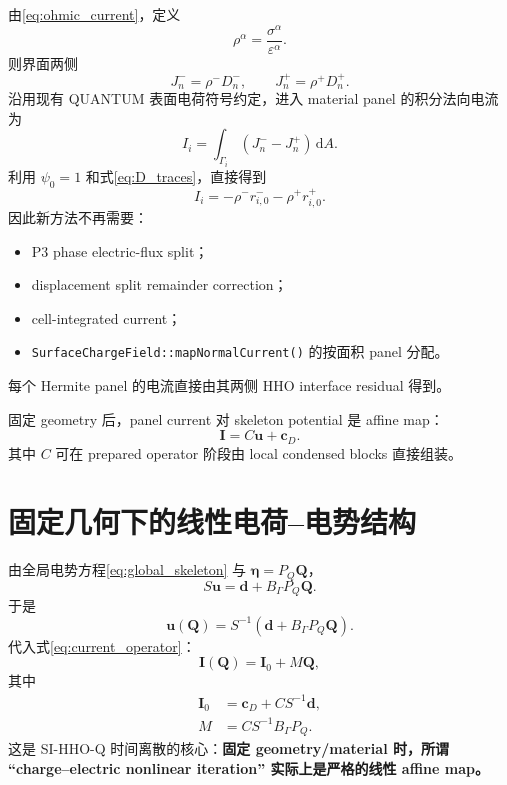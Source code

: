 \documentclass[UTF8,a4paper,11pt]{ctexart}
\newcommand{\dd}{\mathrm{d}}
\newcommand{\eps}{\varepsilon}
\newcommand{\vct}[1]{\bm{#1}}
\begin{document}
由\eqref{eq:ohmic_current}，定义
\[
\rho^\alpha=\frac{\sigma^\alpha}{\eps^\alpha}.
\]
则界面两侧
\[
J_n^-=\rho^-D_n^-,\qquad
J_n^+=\rho^+D_n^+.
\]
沿用现有 QUANTUM 表面电荷符号约定，进入 material panel 的积分法向电流为
\begin{equation}
I_i=\int_{\Gamma_i}(J_n^--J_n^+)\,\dd A.
\label{eq:panel_current_def}
\end{equation}
利用 \(\psi_0=1\) 和式\eqref{eq:D_traces}，直接得到
\begin{equation}
\boxed{
I_i
=-\rho^-r^-_{i,0}
-\rho^+r^+_{i,0}.
}
\label{eq:panel_current_residual}
\end{equation}
因此新方法不再需要：
\begin{itemize}
  \item P3 phase electric-flux split；
  \item displacement split remainder correction；
  \item cell-integrated current；
  \item \texttt{SurfaceChargeField::mapNormalCurrent()} 的按面积 panel 分配。
\end{itemize}
每个 Hermite panel 的电流直接由其两侧 HHO interface residual 得到。

固定 geometry 后，panel current 对 skeleton potential 是 affine map：
\begin{equation}
\boxed{
\vct I=C\vct u+\vct c_D.
}
\label{eq:current_operator}
\end{equation}
其中 \(C\) 可在 prepared operator 阶段由 local condensed blocks 直接组装。

\section{固定几何下的线性电荷--电势结构}

由全局电势方程\eqref{eq:global_skeleton} 与 \(\vct\eta=P_Q\vct Q\)，
\begin{equation}
\boxed{
S\vct u=\vct d+B_\Gamma P_Q\vct Q.
}
\label{eq:potential_charge_system}
\end{equation}
于是
\begin{equation}
\vct u(\vct Q)=S^{-1}\left(\vct d+B_\Gamma P_Q\vct Q\right).
\label{eq:u_of_Q}
\end{equation}
代入式\eqref{eq:current_operator}：
\begin{equation}
\boxed{
\vct I(\vct Q)=\vct I_0+M\vct Q,
}
\label{eq:I_affine_Q}
\end{equation}
其中
\begin{align}
\vct I_0&=\vct c_D+CS^{-1}\vct d,\label{eq:I0}\\
M&=CS^{-1}B_\Gamma P_Q.\label{eq:M_operator}
\end{align}
这是 SI-HHO-Q 时间离散的核心：\textbf{固定 geometry/material 时，所谓 ``charge--electric nonlinear iteration'' 实际上是严格的线性 affine map。}
\end{document}
